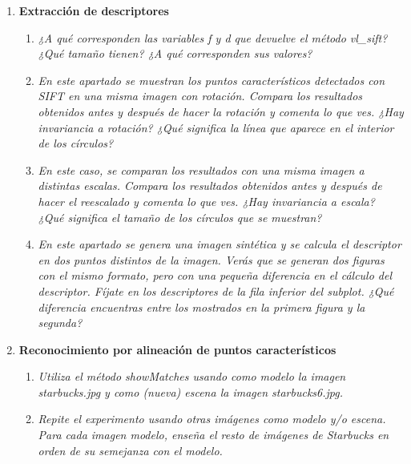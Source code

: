 \documentclass{article}
\begin{document}
\begin{enumerate}
\begin{enumerate}
 \end{enumerate}

\newpage

 \item \textbf{ Extracción de descriptores } 
 
 \begin{enumerate}
 \item \textit{¿A  qué  corresponden  las  variables f y  d que  devuelve  el método  vl\_sift? ¿Qué tamaño tienen? ¿A qué corresponden sus valores?}  
 
 \item \textit{En  este  apartado  se muestran  los  puntos  característicos  detectados  con SIFT  en  una  misma  imagen  con  rotación.  Compara  los  resultados 
obtenidos antes y después de hacer la rotación y comenta lo que ves. ¿Hay 
invariancia a rotación? ¿Qué significa la línea que aparece en el interior de 
los círculos?}

 \item \textit{En  este  caso,  se  comparan  los  resultados  con  una  misma  imagen  a 
distintas  escalas.  Compara  los  resultados  obtenidos  antes  y  después  de 
hacer el reescalado y comenta lo que ves. ¿Hay invariancia a escala? ¿Qué 
significa el tamaño de los círculos que se muestran?}

 \item \textit{En este apartado se genera una imagen sintética y se calcula el descriptor 
en dos puntos distintos de la imagen.  Verás  que  se generan dos  figuras 
con el mismo  formato, pero con una pequeña diferencia en el cálculo del 
descriptor.  Fíjate  en los  descriptores  de la  fila inferior  del subplot.  ¿Qué 
diferencia  encuentras  entre  los  mostrados  en  la  primera  figura  y  la 
segunda?}

 \end{enumerate}

\newpage

 \item \textbf{ Reconocimiento por alineación de puntos característicos}

 \begin{enumerate}
 \item \textit{Utiliza  el  método  showMatches usando  como  modelo  la  imagen 
 starbucks.jpg y como (nueva) escena la imagen starbucks6.jpg.}

 \item \textit{Repite el experimento  usando otras imágenes  como modelo  y/o escena. 
Para cada imagen modelo, enseña el  resto de imágenes de Starbucks en orden de su semejanza con el modelo.}


\end{enumerate}
\end{enumerate}
\end{document}
